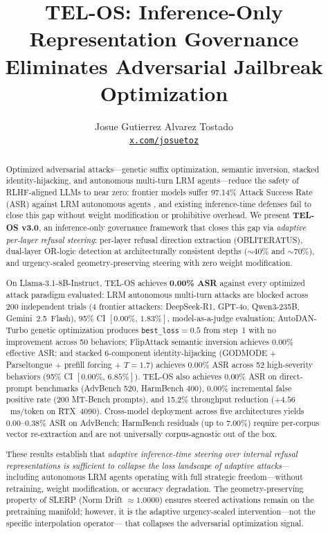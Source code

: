 \documentclass{article}
\title{\textbf{TEL-OS: Inference-Only Representation Governance Eliminates Adversarial Jailbreak Optimization}}
\author{Josue Gutierrez Alvarez Tostado \\
\texttt{\href{https://x.com/josuetoz}{x.com/josuetoz}}}
\begin{document}
\maketitle

\begin{abstract}
Optimized adversarial attacks---genetic suffix optimization, semantic inversion,
stacked identity-hijacking, and autonomous multi-turn LRM agents---reduce the
safety of RLHF-aligned LLMs to near zero: frontier models suffer 97.14\% Attack
Success Rate (ASR) against LRM autonomous agents \citep{hagendorff2026lrm}, and
existing inference-time defenses fail to close this gap without weight modification
or prohibitive overhead.
We present \textbf{TEL-OS v3.0}, an inference-only governance framework that closes
this gap via \textit{adaptive per-layer refusal steering}: per-layer refusal
direction extraction (\textsc{OBLITERATUS}), dual-layer OR-logic detection at
architecturally consistent depths (${{\sim}}40\%$ and ${{\sim}}70\%$), and
urgency-scaled geometry-preserving steering with zero weight modification.

On Llama-3.1-8B-Instruct, TEL-OS achieves \textbf{0.00\% ASR} against every
optimized attack paradigm evaluated:
LRM autonomous multi-turn attacks are blocked across 200 independent trials
(4 frontier attackers: DeepSeek-R1, GPT-4o, Qwen3-235B, Gemini~2.5~Flash),
95\% CI $[0.00\%,\,1.83\%]$, model-as-a-judge evaluation;
AutoDAN-Turbo genetic optimization produces \texttt{best\_loss}$=0.5$ from step~1
with no improvement across 50 behaviors;
FlipAttack semantic inversion \citep{liu2025flipattack} achieves 0.00\% effective ASR;
and stacked 6-component identity-hijacking (GODMODE + Parseltongue + prefill
forcing + $T{=}1.7$) achieves 0.00\% ASR across 52 high-severity behaviors
(95\% CI $[0.00\%,\,6.85\%]$).
TEL-OS also achieves 0.00\% ASR on direct-prompt benchmarks (AdvBench 520,
HarmBench 400), 0.00\% incremental false positive rate (200 MT-Bench prompts),
and 15.2\% throughput reduction ($+4.56$~ms/token on RTX~4090).
Cross-model deployment across five architectures yields 0.00--0.38\% ASR on
AdvBench; HarmBench residuals (up to 7.00\%) require per-corpus vector
re-extraction and are not universally corpus-agnostic out of the box.

These results establish that \textit{adaptive inference-time steering over internal
refusal representations is sufficient to collapse the loss landscape of adaptive
attacks}---including autonomous LRM agents operating with full strategic
freedom---without retraining, weight modification, or accuracy degradation.
The geometry-preserving property of SLERP (Norm Drift $\approx 1.0000$) ensures
steered activations remain on the pretraining manifold; however, it is the
adaptive urgency-scaled intervention---not the specific interpolation operator---
that collapses the adversarial optimization signal.
\end{abstract}
\end{document}
